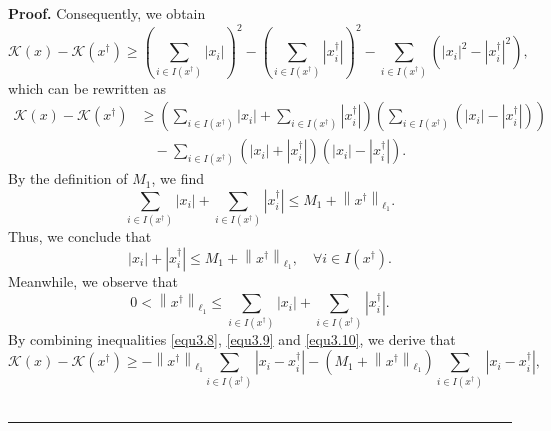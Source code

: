\documentclass[a4paper,12pt]{article}
\numberwithin{equation}{section}
\newenvironment{proof}[1][Proof]{\textbf{#1.} }
{\ \rule{0.75em}{0.75em}\smallskip}
\begin{document}
\begin{proof}
    Consequently, we obtain
    \begin{equation*}
        \mathcal{K}\left(x\right)-\mathcal{K}\left(x^{\dagger}\right) \geq \left(\sum_{i\in I\left(x^{\dagger}\right)}\left|x_{i}\right|\right)^{2} -\left(\sum_{i\in I\left(x^{\dagger}\right)} \left|x_{i}^{\dagger}\right|\right)^{2} - \sum_{i\in I\left(x^{\dagger}\right)} \left(\left|x_{i}\right|^{2} - \left|x_{i}^{\dagger}\right|^{2}\right),
    \end{equation*}
    which can be rewritten as
    \begin{align}\label{equ3.8}
        \mathcal{K}\left(x\right)-\mathcal{K}\left(x^{\dagger}\right) 
        & \geq \left(\sum_{i\in I\left(x^{\dagger}\right)}\left|x_{i}\right| + \sum_{i\in I\left(x^{\dagger}\right)} \left|x_{i}^{\dagger}\right|\right)\left(\sum_{i\in I\left(x^{\dagger}\right)}\left(\left|x_{i}\right|-\left|x_{i}^{\dagger}\right |\right)\right) \nonumber\\
        & \quad -\sum_{i\in I\left(x^{\dagger}\right)} \left(\left|x_{i}\right|+\left|x_{i}^{\dagger}\right|\right) \left(\left|x_{i}\right|-\left|x_{i}^{\dagger}\right|\right).
    \end{align}
    By the definition of $M_{1}$, we find
    \begin{equation*}
        \sum_{i\in I\left(x^{\dagger}\right)}\left|x_{i}\right| + \sum_{i\in I\left(x^{\dagger}\right)} \left|x_{i}^{\dagger}\right| \leq M_{1} + \left\|x^{\dagger}\right\|_{\ell_{1}}.
    \end{equation*}
    Thus, we conclude that
    \begin{equation}\label{equ3.9}
        \left|x_{i}\right| + \left|x_{i}^{\dagger}\right| \leq M_{1} + \left\|x^{\dagger}\right\|_{\ell_{1}}, \quad \forall i\in I\left(x^{\dagger}\right).
    \end{equation}
    Meanwhile, we observe that
    \begin{equation}\label{equ3.10}
        0<\left\|x^{\dagger}\right\|_{\ell_{1}}\leq \sum_{i\in I\left(x^{\dagger}\right)}\left|x_{i}\right| + \sum_{i\in I\left(x^{\dagger}\right)} \left|x_{i}^{\dagger}\right|.
    \end{equation}
    By combining inequalities \eqref{equ3.8}, \eqref{equ3.9} and \eqref{equ3.10}, we derive that
    \begin{equation*}
        \mathcal{K}\left(x\right)-\mathcal{K}\left(x^{\dagger}\right) \geq -\left\|x^{\dagger}\right\|_{\ell_{1}} \sum_{i\in I\left(x^{\dagger}\right)}\left|x_{i}-x_{i}^{\dagger}\right| - \left(M_{1}+\left\|x^{\dagger}\right\|_{\ell_{1}}\right) \sum_{i\in I\left(x^{\dagger}\right)}\left|x_{i}-x_{i}^{\dagger}\right|,

\end{equation*}
\end{proof}
\end{document}
